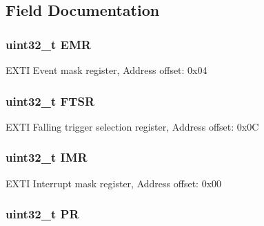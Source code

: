 \subsection{Field Documentation}
\hypertarget{struct_e_x_t_i___type_def_a6034c7458d8e6030f6dacecf0f1a3a89}{
\subsubsection[{E\-M\-R}]{ uint32\-\_\-t E\-M\-R}}\label{struct_e_x_t_i___type_def_a6034c7458d8e6030f6dacecf0f1a3a89}
E\-X\-T\-I Event mask register, Address offset\-: 0x04 \hypertarget{struct_e_x_t_i___type_def_aa0f7c828c46ae6f6bc9f66f11720bbe6}{
\subsubsection[{F\-T\-S\-R}]{ uint32\-\_\-t F\-T\-S\-R}}\label{struct_e_x_t_i___type_def_aa0f7c828c46ae6f6bc9f66f11720bbe6}
E\-X\-T\-I Falling trigger selection register, Address offset\-: 0x0\-C \hypertarget{struct_e_x_t_i___type_def_ae845b86e973b4bf8a33c447c261633f6}{
\subsubsection[{I\-M\-R}]{ uint32\-\_\-t I\-M\-R}}\label{struct_e_x_t_i___type_def_ae845b86e973b4bf8a33c447c261633f6}
E\-X\-T\-I Interrupt mask register, Address offset\-: 0x00 \hypertarget{struct_e_x_t_i___type_def_af8d25514079514d38c104402f46470af}{
\subsubsection[{P\-R}]{ uint32\-\_\-t P\-R}}\label{struct_e_x_t_i___type_def_af8d25514079514d38c104402f46470af}
